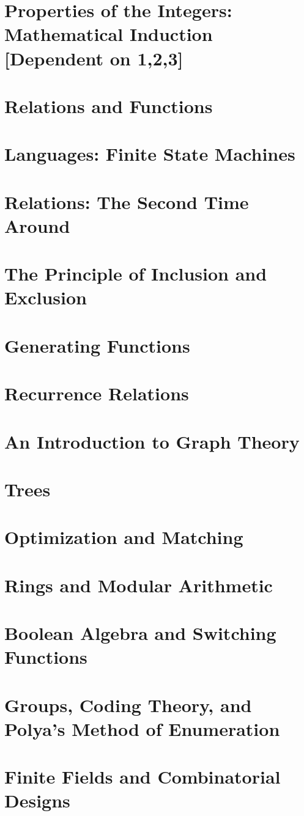 \documentclass[a4paper,12pt]{article}
\theoremstyle{definition}
\theoremstyle{remark}
\begin{document}
\section{Properties of the Integers: Mathematical Induction [Dependent on 1,2,3]}
\section{Relations and Functions}
\section{Languages: Finite State Machines}
\section{Relations: The Second Time Around}
\section{The Principle of Inclusion and Exclusion}
\section{Generating Functions}
\section{Recurrence Relations}
\section{An Introduction to Graph Theory}
\section{Trees}
\section{Optimization and Matching}
\section{Rings and Modular Arithmetic}
\section{Boolean Algebra and Switching Functions}
\section{Groups, Coding Theory, and Polya's Method of Enumeration}
\section{Finite Fields and Combinatorial Designs}
\end{document}

